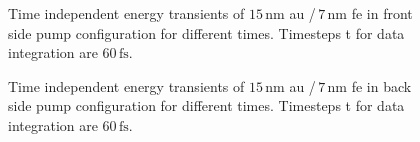 \documentclass[a4paper,12pt,twoside]{article}
\begin{document}
		\begin{figure}[H]
		\caption{Time independent energy transients of $15\,\mathrm{\mbox{nm}}$ \gls{au} /\,$7\,\mathrm{\mbox{nm}}$ \gls{fe} in front side pump configuration for different times. Timesteps \textDelta t for data integration are $60\,\mathrm{fs}$.}
    		\label{transients5}
	\end{figure}
		\begin{figure}[H]
		\caption{Time independent energy transients of $15\,\mathrm{\mbox{nm}}$ \gls{au} /\,$7\,\mathrm{\mbox{nm}}$ \gls{fe} in back side pump configuration for different times. Timesteps \textDelta t for data integration are $60\,\mathrm{fs}$.}
    		\label{transients6}
	\end{figure}
\end{document}
